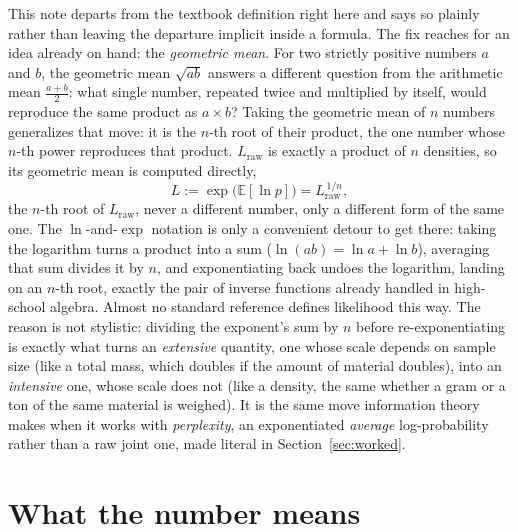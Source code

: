 \documentclass[11pt]{article}
\begin{document}
This note departs from the textbook definition right here and says so
plainly rather than leaving the departure implicit inside a formula.
The fix reaches for an idea already on hand: the \emph{geometric
mean}. For two strictly positive numbers $a$ and $b$, the geometric
mean $\sqrt{ab}$ answers a different question from the arithmetic mean
$\frac{a+b}{2}$: what single number, repeated twice and multiplied by
itself, would reproduce the same product as $a \times b$? Taking the
geometric mean of $n$ numbers generalizes that move: it is the $n$-th
root of their product, the one number whose $n$-th power reproduces
that product. $L_{\text{raw}}$ is exactly a product of $n$ densities,
so its geometric mean is computed directly,
$$L := \exp\!\big(\mathbb E[\ln p]\big) = L_{\text{raw}}^{\,1/n},$$
the $n$-th root of $L_{\text{raw}}$, never a different number, only a
different form of the same one. The $\ln$-and-$\exp$ notation is only a
convenient detour to get there: taking the logarithm turns a product
into a sum ($\ln(ab) = \ln a + \ln b$), averaging that sum divides it
by $n$, and exponentiating back undoes the logarithm, landing on an
$n$-th root, exactly the pair of inverse functions already handled in
high-school algebra. Almost no standard reference defines likelihood
this way. The reason is not stylistic: dividing the exponent's sum by
$n$ before re-exponentiating is exactly what turns an \emph{extensive}
quantity, one whose scale depends on sample size (like a total mass,
which doubles if the amount of material doubles), into an
\emph{intensive} one, whose scale does not (like a density, the same
whether a gram or a ton of the same material is weighed). It is the
same move information theory makes when it works with
\emph{perplexity}, an exponentiated \emph{average} log-probability
rather than a raw joint one, made literal in Section~\ref{sec:worked}.

\clearpage
\section{What the number means}
\label{sec:meaning}
\end{document}
